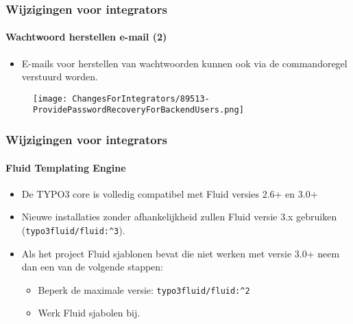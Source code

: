 
\begin{frame}[fragile]
	\frametitle{Wijzigingen voor integrators}
	\framesubtitle{Wachtwoord herstellen e-mail (2)}

	\begin{itemize}
		\item E-mails voor herstellen van wachtwoorden kunnen ook via de commandoregel verstuurd worden.
	\end{itemize}

	\begin{figure}
		\texttt{[image: ChangesForIntegrators/89513-ProvidePasswordRecoveryForBackendUsers.png]}
	\end{figure}

\end{frame}


\begin{frame}[fragile]
	\frametitle{Wijzigingen voor integrators}
	\framesubtitle{Fluid Templating Engine}

	\begin{itemize}
		\item De TYPO3 core is volledig compatibel met Fluid versies 2.6+ en 3.0+
		\item Nieuwe installaties zonder afhankelijkheid zullen Fluid versie 3.x gebruiken
			(\texttt{typo3fluid/fluid:\^{}3}).
		\item Als het project Fluid sjablonen bevat die niet werken met versie 3.0+ neem dan
			een van de volgende stappen:

			\begin{itemize}
				\item Beperk de maximale versie: \texttt{typo3fluid/fluid:\^{}2}
				\item Werk Fluid sjabolen bij.
			\end{itemize}

	\end{itemize}

\end{frame}


